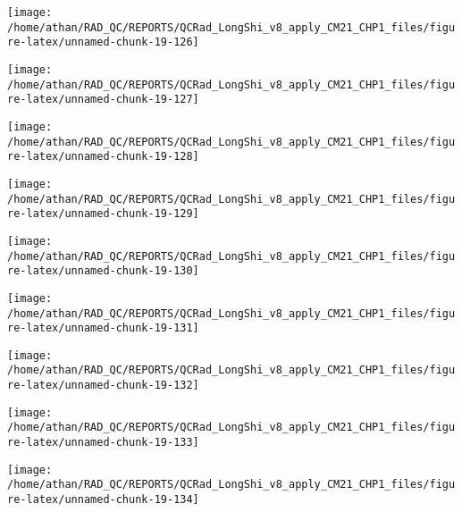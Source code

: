 \documentclass[
  10pt,
  a4paper,oneside]{article}
\begin{document}
\begin{center}\texttt{[image: /home/athan/RAD\_QC/REPORTS/QCRad\_LongShi\_v8\_apply\_CM21\_CHP1\_files/figure-latex/unnamed-chunk-19-126]} \end{center}

\begin{center}\texttt{[image: /home/athan/RAD\_QC/REPORTS/QCRad\_LongShi\_v8\_apply\_CM21\_CHP1\_files/figure-latex/unnamed-chunk-19-127]} \end{center}

\begin{center}\texttt{[image: /home/athan/RAD\_QC/REPORTS/QCRad\_LongShi\_v8\_apply\_CM21\_CHP1\_files/figure-latex/unnamed-chunk-19-128]} \end{center}

\begin{center}\texttt{[image: /home/athan/RAD\_QC/REPORTS/QCRad\_LongShi\_v8\_apply\_CM21\_CHP1\_files/figure-latex/unnamed-chunk-19-129]} \end{center}

\begin{center}\texttt{[image: /home/athan/RAD\_QC/REPORTS/QCRad\_LongShi\_v8\_apply\_CM21\_CHP1\_files/figure-latex/unnamed-chunk-19-130]} \end{center}

\begin{center}\texttt{[image: /home/athan/RAD\_QC/REPORTS/QCRad\_LongShi\_v8\_apply\_CM21\_CHP1\_files/figure-latex/unnamed-chunk-19-131]} \end{center}

\begin{center}\texttt{[image: /home/athan/RAD\_QC/REPORTS/QCRad\_LongShi\_v8\_apply\_CM21\_CHP1\_files/figure-latex/unnamed-chunk-19-132]} \end{center}

\begin{center}\texttt{[image: /home/athan/RAD\_QC/REPORTS/QCRad\_LongShi\_v8\_apply\_CM21\_CHP1\_files/figure-latex/unnamed-chunk-19-133]} \end{center}

\begin{center}\texttt{[image: /home/athan/RAD\_QC/REPORTS/QCRad\_LongShi\_v8\_apply\_CM21\_CHP1\_files/figure-latex/unnamed-chunk-19-134]} \end{center}
\end{document}

